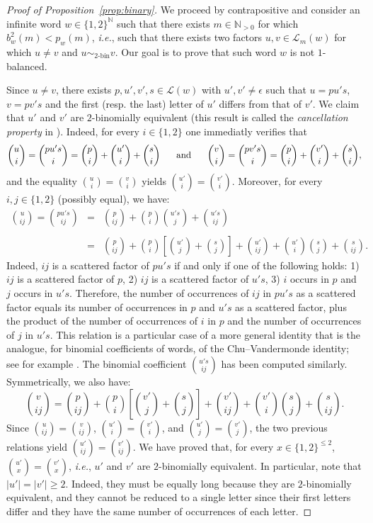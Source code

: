 \documentclass{template_arxiv}
\theoremstyle{definition}
\newcommand{\ds}{\displaystyle}
\newcommand{\N}{\mathbb{N}}
\newcommand{\lan}{\mathcal{L}}
\begin{document}
\begin{proof}[Proof of Proposition~\ref{prop:binary}]
We proceed by contrapositive and consider an infinite word $w\in\{1,2\}^\N$ such that there exists $m\in\N_{>0}$ for which $b_w^2(m)<p_w(m)$, \emph{i.e.}, such that there exists two factors $u,v\in\lan_m(w)$ for which $u\neq v$ and $u\sim_{2\text{-bin}}v$. Our goal is to prove that such word $w$ is not $1$-balanced.

Since $u\neq v$, there exists $p,u',v',s\in\lan(w)$ with $u',v'\neq\epsilon$ such that $u=pu's$, $v=pv's$ and the first (resp. the last) letter of $u'$ differs from that of $v'$. We claim that $u'$ and $v'$ are $2$-binomially equivalent (this result is called the \emph{cancellation property} in \cite[Lemma~2.2]{RSW24}). Indeed, for every $i\in\{1,2\}$ one immediatly verifies that
\[
    \binom{u}{i}=\binom{pu's}{i}=\binom{p}{i}+\binom{u'}{i}+\binom{s}{i} \hspace{0.5cm}\text{ and }\hspace{0.5cm} \binom{v}{i}=\binom{pv's}{i}=\binom{p}{i}+\binom{v'}{i}+\binom{s}{i},
\]
and the equality $\binom{u}{i}=\binom{v}{i}$ yields $\binom{u'}{i}=\binom{v'}{i}$. Moreover, for every $i,j\in\{1,2\}$ (possibly equal), we have:
\[
    \begin{array}{rcl}
        \ds\binom{u}{ij}=\binom{pu's}{ij} &=& \ds\binom{p}{ij}+\binom{p}{i}\binom{u's}{j}+\binom{u's}{ij}\\
        \\
        &=&\ds\binom{p}{ij}+\binom{p}{i}\left[\binom{u'}{j}+\binom{s}{j}\right]+\binom{u'}{ij}+\binom{u'}{i}\binom{s}{j}+\binom{s}{ij}.
    \end{array}
\]
Indeed, $ij$ is a scattered factor of $pu's$ if and only if one of the following holds: 1) $ij$ is a scattered factor of $p$, 2) $ij$ is a scattered factor of $u's$, 3) $i$ occurs in $p$ and $j$ occurs in $u's$. Therefore, the number of occurrences of $ij$ in $pu's$ as a scattered factor equals its number of occurrences in $p$ and $u's$ as a scattered factor, plus the product of the number of occurrences of $i$ in $p$ and the number of occurrences of $j$ in $u's$. This relation is a particular case of a more general identity that is the analogue, for binomial coefficients of words, of the Chu--Vandermonde identity; see for example \cite[Proposition~1]{RS15}. The binomial coefficient $\binom{u's}{ij}$ has been computed similarly. Symmetrically, we also have:
\[
    \binom{v}{ij}=\binom{p}{ij}+\binom{p}{i}\left[\binom{v'}{j}+\binom{s}{j}\right]+\binom{v'}{ij}+\binom{v'}{i}\binom{s}{j}+\binom{s}{ij}.
\]
Since $\binom{u}{ij}=\binom{v}{ij}$, $\binom{u'}{i}=\binom{v'}{i}$, and $\binom{u'}{j}=\binom{v'}{j}$, the two previous relations yield $\binom{u'}{ij}=\binom{v'}{ij}$. We have proved that, for every $x\in\{1,2\}^{\leq 2}$, $\binom{u'}{x}=\binom{v'}{x}$, \emph{i.e.}, $u'$ and $v'$ are $2$-binomially equivalent. In particular, note that $|u'|=|v'|\geq 2$. Indeed, they must be equally long because they are $2$-binomially equivalent, and they cannot be reduced to a single letter since their first letters differ and they have the same number of occurrences of each letter.


\end{proof}
\end{document}
